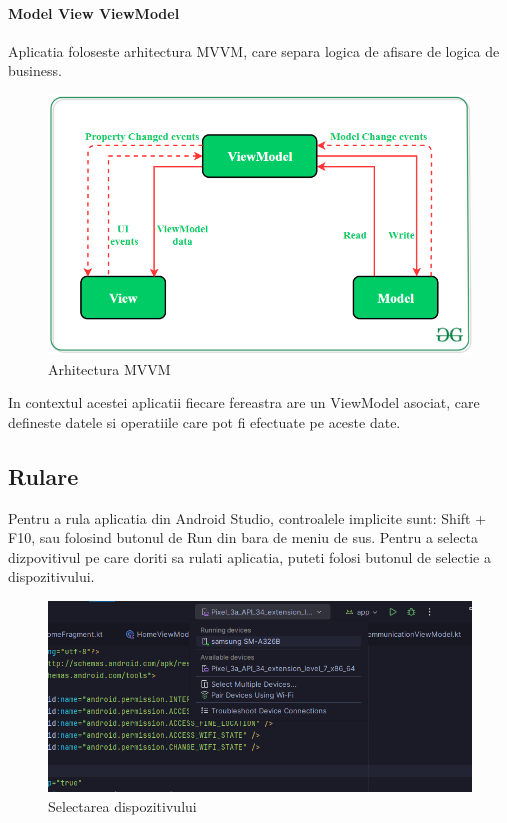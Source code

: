 \paragraph{Model View ViewModel}
Aplicatia foloseste arhitectura MVVM, care separa logica de afisare de logica de business.
\begin{figure}[H]
    \centering
    \includegraphics[width=0.7\linewidth]{figs/mvvm.png}
    \caption{Arhitectura MVVM}
    \label{fig:mvvm}
\end{figure}
In contextul acestei aplicatii fiecare fereastra are un ViewModel asociat, care defineste
datele si operatiile care pot fi efectuate pe aceste date.

\subsection{Rulare}
Pentru a rula aplicatia din Android Studio,
controalele implicite sunt: Shift + F10, sau folosind butonul de Run din bara de meniu de sus.
Pentru a selecta dizpovitivul pe care doriti sa rulati aplicatia, puteti folosi butonul de selectie a dispozitivului.
\begin{figure}[H]
    \centering
    \includegraphics[width=0.7\linewidth]{figs/select_device.png}
    \caption{Selectarea dispozitivului}
    \label{fig:select_device}
\end{figure}